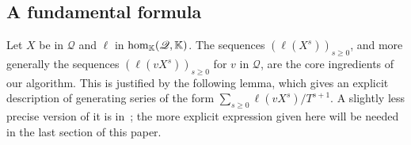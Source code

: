 \documentclass[12pt]{article}
\newcommand{\lf}{X}
\newcommand{\residueI}{\mathscr{Q}}
\def\K{\mathbb{K}}
\def\K {\ensuremath{\mathbb{K}}}
\begin{document}

\subsection{A fundamental formula}  \label{ssec:genseries}

Let $\lf$ be in $\residueI$ and $\ell$ in ${\rm hom}_\K(\residueI,\K)$.  The
sequences $(\ell(\lf^s))_{s\ge 0}$, and more generally the sequences $(\ell(v
\lf^s))_{s\ge 0}$ for $v$ in $\residueI$, are the core ingredients of our
algorithm.  This is justified by the following lemma, which gives an explicit
description of generating series of the form $\sum_{s \ge 0} \ell(v
\lf^s)/T^{s+1}$. A slightly less precise version of it is in~\cite{BoSaSc03};
the more explicit expression given here will be needed in the last section of
this paper.
\end{document}
